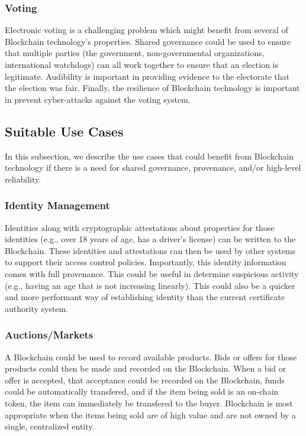 \subsubsection{Voting}
Electronic voting is a challenging problem which might benefit from several of Blockchain technology's properties.
Shared governance could be used to ensure that multiple parties (the government, non-governmental organizations, international watchdogs) can all work together to ensure that an election is legitimate.
Audibility is important in providing evidence to the electorate that the election was fair.
Finally, the resilience of Blockchain technology is important in prevent cyber-attacks against the voting system.

\subsection{Suitable Use Cases}
In this subsection, we describe the use cases that could benefit from Blockchain technology if there is a need for shared governance, provenance, and/or high-level reliability.

\subsubsection{Identity Management}
Identities along with cryptographic attestations about properties for those identities (e.g., over 18 years of age, has a driver's license) can be written to the Blockchain.
These identities and attestations can then be used by other systems to support their access control policies.
Importantly, this identity information comes with full provenance. This could be useful in determine suspicious activity (e.g., having an age that is not increasing linearly).
This could also be a quicker and more performant way of establishing identity than the current certificate authority system.

\subsubsection{Auctions/Markets}
A Blockchain could be used to record available products.
Bids or offers for those products could then be made and recorded on the Blockchain.
When a bid or offer is accepted, that acceptance could be recorded on the Blockchain, funds could be automatically transfered, and if the item being sold is an on-chain token, the item can immediately be transfered to the buyer.
Blockchain is most appropriate when the items being sold are of high value and are not owned by a single, centralized entity.


